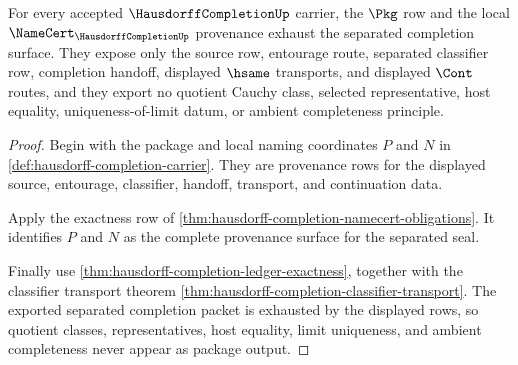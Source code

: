 \begin{theorem}
\label{thm:hausdorffcompletion-separated-package-exhaustion}
For every accepted $\HausdorffCompletionUp$ carrier, the $\Pkg$ row and the local $\NameCert_{\HausdorffCompletionUp}$ provenance exhaust the separated completion surface. They expose only the source row, entourage route, separated classifier row, completion handoff, displayed $\hsame$ transports, and displayed $\Cont$ routes, and they export no quotient Cauchy class, selected representative, host equality, uniqueness-of-limit datum, or ambient completeness principle.
\end{theorem}
\begin{proof}
Begin with the package and local naming coordinates $P$ and $N$ in \autoref{def:hausdorff-completion-carrier}. They are provenance rows for the displayed source, entourage, classifier, handoff, transport, and continuation data.

Apply the exactness row of \autoref{thm:hausdorff-completion-namecert-obligations}. It identifies $P$ and $N$ as the complete provenance surface for the separated seal.

Finally use \autoref{thm:hausdorff-completion-ledger-exactness}, together with the classifier transport theorem \autoref{thm:hausdorff-completion-classifier-transport}. The exported separated completion packet is exhausted by the displayed rows, so quotient classes, representatives, host equality, limit uniqueness, and ambient completeness never appear as package output.
\end{proof}


